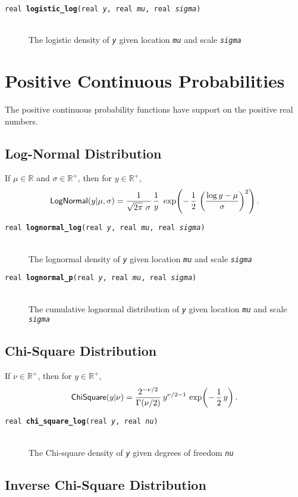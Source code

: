 \documentclass[10pt]{report}
\newcommand{\distro}[1]{\mbox{\sf #1}}
\newcommand{\reals}{\mathbb{R}}
\newcommand{\posreals}{\mathbb{R}^+}
\newcommand{\fitem}[4]{\item[{\tt #1 {\bfseries #2}(#3)}]\mbox{ } \\[4pt] #4}
\newcommand{\farg}[1]{{\tt\slshape #1}}
\begin{document}
\begin{description}
\fitem{real}{logistic\_log}{real \farg{y}, real \farg{mu},
real \farg{sigma}}{ The logistic density of \farg{y} given
location \farg{mu} and scale \farg{sigma}}
\end{description}


\section{Positive Continuous Probabilities}

The positive continuous probability functions have support on the
positive real numbers.

\subsection{Log-Normal Distribution}

If $\mu \in \reals$ and $\sigma \in \posreals$, then for $y \in
\posreals$, 
\[
\distro{LogNormal}(y|\mu,\sigma)
=
\frac{1}{\sqrt{2 \pi} \ \sigma}
\,
\frac{1}{y}
\
\exp \! \left(
       - \, \frac{1}{2}
       \, \left( \frac{\log y - \mu}{\sigma} \right)^2
     \right)
.
\]

\begin{description}
 \fitem{real}{lognormal\_log}{real \farg{y}, real \farg{mu}, real
  \farg{sigma}}{The lognormal density of \farg{y} given location
  \farg{mu} and scale \farg{sigma}}
%
\fitem{real}{lognormal\_p}{real \farg{y}, real \farg{mu}, real
  \farg{sigma}}{The cumulative lognormal distribution of \farg{y}
  given location \farg{mu} and scale \farg{sigma}}
\end{description}

\subsection{Chi-Square Distribution}

If $\nu \in \posreals$, then for $y \in \posreals$,
\[
\distro{ChiSquare}(y|\nu)
=
\frac{2^{-\nu/2}}
    {\Gamma(\nu / 2)}
\,
y^{\nu/2 - 1}
\,
\exp \! \left( -\, \frac{1}{2} \, y \right)
.
\]

\begin{description}
\fitem{real}{chi\_square\_log}{real \farg{y}, real \farg{nu}}{The
  Chi-square density of \farg{y} given degrees of freedom
  \farg{nu}}
\end{description}

\subsection{Inverse Chi-Square Distribution}
\end{document}

